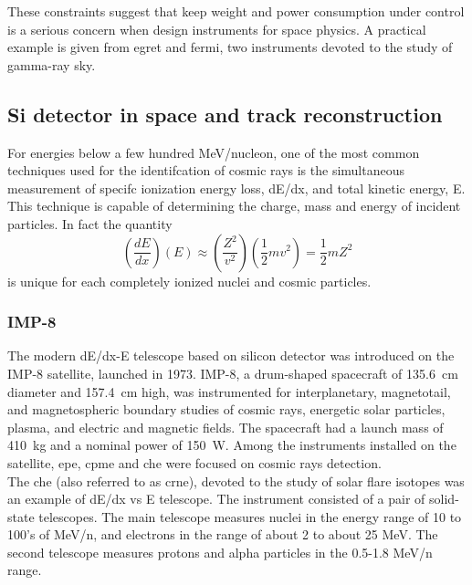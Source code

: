 These constraints suggest that keep weight and power consumption under control
is a serious concern when design instruments for space physics. A practical
example is given from \gls{egret} and \gls{fermi}, two instruments devoted to
the study of gamma-ray sky. 



\subsection{Si detector in space and track reconstruction}
\label{sec:tracking_spazio}


For energies below a few hundred MeV/nucleon, one of the most common
techniques used for the identifcation of cosmic rays is the
simultaneous measurement of specifc ionization energy loss, dE/dx, and
total kinetic energy, E. This technique is capable of determining the
charge, mass and energy of incident particles. In fact the quantity 
\begin{equation}
  \left( \frac{dE}{dx} \right)\left( E \right) \approx \left( \frac{Z^2}{v^2} \right)\left( \frac{1}{2}mv^2 \right)= \frac{1}{2}mZ^2 
\end{equation}
is unique for each completely ionized nuclei and cosmic particles.\\

\subsubsection*{IMP-8}
\hskip 1cm The modern dE/dx-E telescope based on silicon detector was
introduced on the IMP-8 satellite, launched in 1973. IMP-8, a
drum-shaped spacecraft of 135.6~cm diameter and 157.4~cm high, was
instrumented for interplanetary, magnetotail, and magnetospheric
boundary studies of cosmic rays, energetic solar particles, plasma,
and electric and magnetic fields. The spacecraft had a launch mass of
410~kg and a nominal power of 150~W. Among the instruments installed
on the satellite, \gls{epe}, \gls{cpme} and \gls{che} were focused on cosmic rays detection.\\
The \gls{che} (also referred to as \gls{crne}), devoted to the study
of solar flare isotopes was an example of dE/dx vs E telescope. The
instrument consisted of a pair of solid-state telescopes. The main
telescope measures nuclei in the energy range of 10 to 100's of MeV/n,
and electrons in the range of about 2 to about 25 MeV. The second
telescope measures protons and alpha particles in the 0.5-1.8 MeV/n
range.

